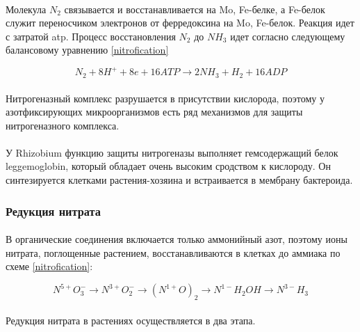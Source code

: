 \paragraph*{}Молекула $N_{2}$ связывается и восстанавливается на Mo, Fe-белке, а Fe-белок служит переносчиком электронов от ферредоксина на Mo, Fe-белок. Реакция идет с затратой \gls{atp}. Процесс восстановления $N_{2}$ до $NH_{3}$ идет согласно следующему балансовому уравнению \ref{nitrofication}

\begin{equation}
N_{2} + 8H^{+} + 8e + 16ATP \rightarrow 2NH_{3} + H_{2} + 16ADP
\label{nitrofication}
\end{equation}
            
\paragraph*{}Нитрогеназный комплекс разрушается в присутствии кислорода, поэтому у азотфиксирующих микроорганизмов есть ряд механизмов для защиты нитрогеназного комплекса. 

\paragraph*{}У Rhizobium функцию защиты нитрогеназы выполняет гемсодержащий белок \hypertarget{leggemoglobin}{\gls{leggemoglobin}}, который обладает очень высоким сродством к кислороду. Он синтезируется клетками растения-хозяина и встраивается в мембрану бактероида. 

\subsubsection*{Редукция нитрата}

\paragraph*{}В органические соединения включается только аммонийный азот, поэтому ионы нитрата, поглощенные растением, восстанавливаются в клетках до аммиака по схеме \ref{nitrofication}:

\begin{equation}
	\label{nitrophication}
	N^{5+}O^{-}_{3} \rightarrow N^{3+}O^{-}_{2} \rightarrow (N^{1+}O)_{2} \rightarrow N^{1-}H_{2}OH \rightarrow N^{3-}H_{3}
\end{equation}

\paragraph*{}Редукция нитрата в растениях осуществляется в два этапа. 

